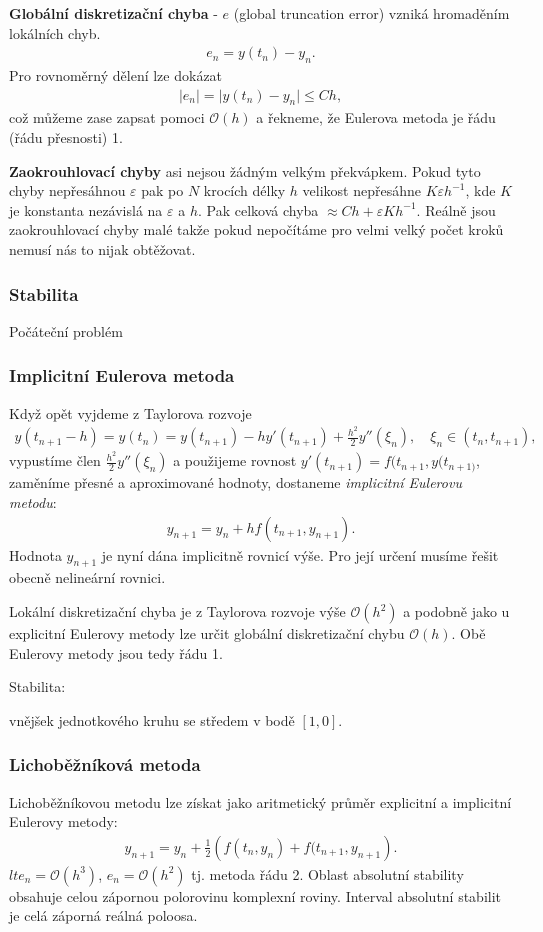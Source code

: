 \documentclass[a4]{report}
\newcommand{\eps}{\varepsilon}
\theoremstyle{definition}
\begin{document}
{\textbf{Globální diskretizační chyba} - $e$ (global truncation error) vzniká hromaděním lokálních chyb. 
\begin{align}
e_{n}= y(t_{n})-y_{n}.
\end{align}
Pro rovnoměrný dělení lze dokázat 
\begin{align}
\vert e_{n} \vert = \vert y(t_{n})-y_{n} \vert \leq C h,
\end{align}
což můžeme zase zapsat pomoci $\mathcal{O}(h)$ a řekneme, že Eulerova metoda je řádu (řádu přesnosti) 1. 

\textbf{Zaokrouhlovací chyby} asi nejsou žádným velkým překvápkem. Pokud tyto chyby nepřesáhnou $\varepsilon$ pak po $N$ krocích délky $h$ velikost nepřesáhne $K \varepsilon h^{-1}$, kde $K$ je konstanta nezávislá na $\eps$ a $ h$. Pak celková chyba $\approx Ch+ \eps K h^{-1}$. Reálně jsou zaokrouhlovací chyby malé takže pokud nepočítáme pro velmi velký počet kroků nemusí nás to nijak obtěžovat. 

\subsubsection*{Stabilita}
Počáteční problém
\subsubsection*{Implicitní Eulerova metoda}
Když opět vyjdeme z Taylorova rozvoje
\begin{align}
y(t_{n+1}-h)= y(t_{n}) = y(t_{n+1}) -hy'(t_{n+1})+ \frac{h^{2}}{2} y'' (\xi_{n}), \quad \xi_{n} \in (t_{n},t_{n+1}),
\end{align}
vypustíme člen $\frac{h^{2}}{2} y'' (\xi_{n})$ a použijeme rovnost $y'(t_{n+1})=f(t_{n+1},y(t_{n+1)}$, zaměníme přesné a aproximované hodnoty, dostaneme \textit{implicitní Eulerovu metodu}:
\begin{align}
y_{n+1}=y_{n}+h f(t_{n+1},y_{n+1}).
\end{align}
Hodnota $y_{n+1}$ je nyní dána implicitně rovnicí výše. Pro její určení musíme řešit obecně nelineární rovnici. 

Lokální diskretizační chyba je z Taylorova rozvoje výše  $\mathcal{O}(h^{2})$ a podobně jako u explicitní Eulerovy metody lze určit globální diskretizační chybu $\mathcal{O}(h)$. Obě Eulerovy metody jsou tedy řádu 1. 

Stabilita: 

vnějšek jednotkového kruhu se středem v bodě $[1,0]$. 

\subsubsection*{Lichoběžníková metoda}
Lichoběžníkovou metodu lze získat jako aritmetický průměr explicitní a implicitní Eulerovy metody:
\begin{align}
y_{n+1}= y_{n}+ \frac{1}{2} \left( f(t_{n},y_{n}) + f(t_{n+1},y_{n+1} \right).
\end{align}
$lte_{n} = \mathcal{O}(h^{3})$, $e_{n}= \mathcal{O}(h^{2})$ tj. metoda řádu 2. Oblast absolutní stability obsahuje celou zápornou polorovinu komplexní roviny. Interval absolutní stabilit je celá záporná reálná poloosa.  

}
\end{document}

